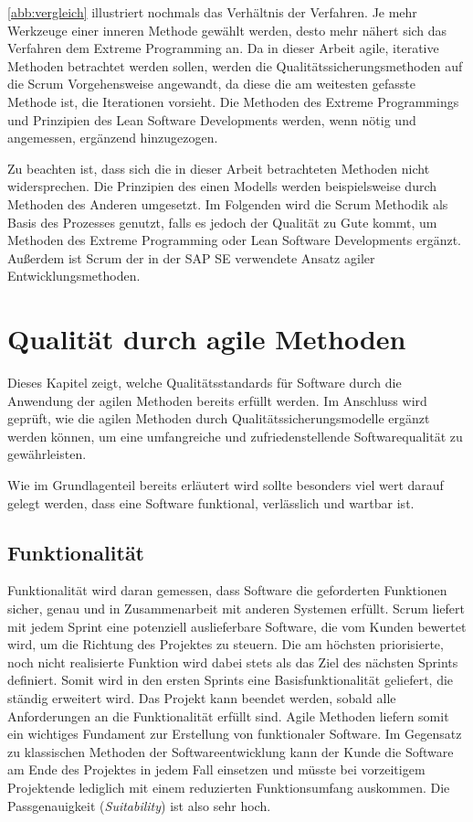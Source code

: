         \autoref{abb:vergleich} illustriert nochmals das Verhältnis der Verfahren. Je mehr Werkzeuge einer inneren Methode gewählt werden, desto mehr nähert sich das Verfahren dem Extreme Programming an. Da in dieser Arbeit agile, iterative Methoden betrachtet werden sollen, werden die Qualitätssicherungsmethoden auf die Scrum Vorgehensweise angewandt, da diese die am weitesten gefasste Methode ist, die Iterationen vorsieht. Die Methoden des Extreme Programmings und Prinzipien des Lean Software Developments werden, wenn nötig und angemessen, ergänzend hinzugezogen.

        Zu beachten ist, dass sich die in dieser Arbeit betrachteten Methoden nicht widersprechen. Die Prinzipien des einen Modells werden beispielsweise durch Methoden des Anderen umgesetzt. Im Folgenden wird die Scrum Methodik als Basis des Prozesses genutzt, falls es jedoch der Qualität zu Gute kommt, um Methoden des Extreme Programming oder Lean Software Developments ergänzt. Außerdem ist Scrum der in der SAP SE verwendete Ansatz agiler Entwicklungsmethoden.

    \section{Qualität durch agile Methoden}

        Dieses Kapitel zeigt, welche Qualitätsstandards für Software durch die Anwendung der agilen Methoden bereits erfüllt werden. Im Anschluss wird geprüft, wie die agilen Methoden durch Qualitätssicherungsmodelle ergänzt werden können, um eine umfangreiche und zufriedenstellende Softwarequalität zu gewährleisten.

        Wie im Grundlagenteil bereits erläutert wird sollte besonders viel wert darauf gelegt werden, dass eine Software funktional, verlässlich und wartbar ist.

        \subsection{Funktionalität}

            Funktionalität wird daran gemessen, dass Software die geforderten Funktionen sicher, genau und in Zusammenarbeit mit anderen Systemen erfüllt. Scrum liefert mit jedem Sprint eine potenziell auslieferbare Software, die vom Kunden bewertet wird, um die Richtung des Projektes zu steuern. Die am höchsten priorisierte, noch nicht realisierte Funktion wird dabei stets als das Ziel des nächsten Sprints definiert. Somit wird in den ersten Sprints eine Basisfunktionalität geliefert, die ständig erweitert wird. Das Projekt kann beendet werden, sobald alle Anforderungen an die Funktionalität erfüllt sind. Agile Methoden liefern somit ein wichtiges Fundament zur Erstellung von funktionaler Software. Im Gegensatz zu klassischen Methoden der Softwareentwicklung kann der Kunde die Software am Ende des Projektes in jedem Fall einsetzen und müsste bei vorzeitigem Projektende lediglich mit einem reduzierten Funktionsumfang auskommen. Die Passgenauigkeit (\emph{Suitability}) ist also sehr hoch.


